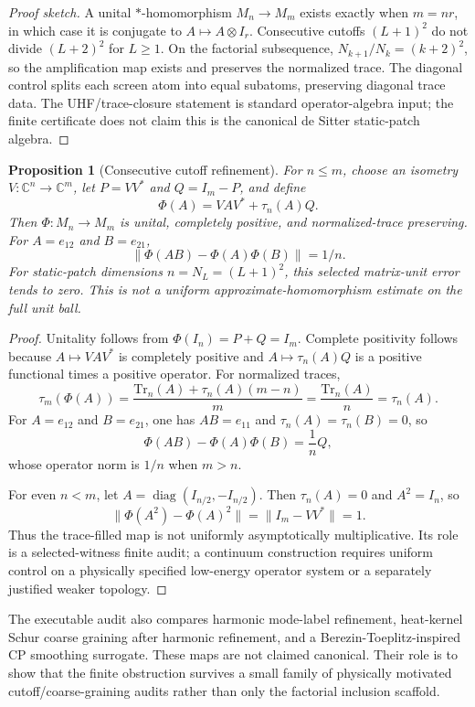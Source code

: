 \documentclass[11pt]{article}
\newtheorem{proposition}[theorem]{Proposition}
\newcommand{\Tr}{\mathrm{Tr}}
\begin{document}
\begin{proof}[Proof sketch]
A unital $*$-homomorphism $M_n\to M_m$ exists exactly when $m=nr$, in which
case it is conjugate to $A\mapsto A\otimes I_r$. Consecutive cutoffs
$(L+1)^2$ do not divide $(L+2)^2$ for $L\ge1$. On the factorial subsequence,
$N_{k+1}/N_k=(k+2)^2$, so the amplification map exists and preserves the
normalized trace. The diagonal control splits each screen atom into equal
subatoms, preserving diagonal trace data. The UHF/trace-closure statement is
standard operator-algebra input; the finite certificate does not claim this is
the canonical de Sitter static-patch algebra.
\end{proof}

\begin{proposition}[Consecutive cutoff refinement]
For $n\le m$, choose an isometry $V:\mathbb{C}^n\to\mathbb{C}^m$, let
$P=VV^*$ and $Q=I_m-P$, and define
\[
  \Phi(A)=VAV^*+\tau_n(A)Q.
\]
Then $\Phi:M_n\to M_m$ is unital, completely positive, and normalized-trace
preserving. For $A=e_{12}$ and $B=e_{21}$,
\[
  \|\Phi(AB)-\Phi(A)\Phi(B)\|=1/n.
\]
For static-patch dimensions $n=N_L=(L+1)^2$, this selected matrix-unit error
tends to zero. This is not a uniform approximate-homomorphism estimate on the
full unit ball.
\end{proposition}

\begin{proof}
Unitality follows from $\Phi(I_n)=P+Q=I_m$. Complete positivity follows
because $A\mapsto VAV^*$ is completely positive and
$A\mapsto\tau_n(A)Q$ is a positive functional times a positive operator. For
normalized traces,
\[
  \tau_m(\Phi(A))
  =\frac{\Tr_n(A)+\tau_n(A)(m-n)}{m}
  =\frac{\Tr_n(A)}{n}
  =\tau_n(A).
\]
For $A=e_{12}$ and $B=e_{21}$, one has $AB=e_{11}$ and
$\tau_n(A)=\tau_n(B)=0$, so
\[
  \Phi(AB)-\Phi(A)\Phi(B)=\frac{1}{n}Q,
\]
whose operator norm is $1/n$ when $m>n$.

For even $n<m$, let $A=\operatorname{diag}(I_{n/2},-I_{n/2})$. Then
$\tau_n(A)=0$ and $A^2=I_n$, so
\[
  \|\Phi(A^2)-\Phi(A)^2\|=\|I_m-VV^*\|=1.
\]
Thus the trace-filled map is not uniformly asymptotically multiplicative. Its
role is a selected-witness finite audit; a continuum construction requires
uniform control on a physically specified low-energy operator system or a
separately justified weaker topology.
\end{proof}

The executable audit also compares harmonic mode-label refinement,
heat-kernel Schur coarse graining after harmonic refinement, and a
Berezin-Toeplitz-inspired CP smoothing surrogate. These maps are not claimed
canonical. Their role is to show that the finite obstruction survives a small
family of physically motivated cutoff/coarse-graining audits rather than only
the factorial inclusion scaffold.
\end{document}
